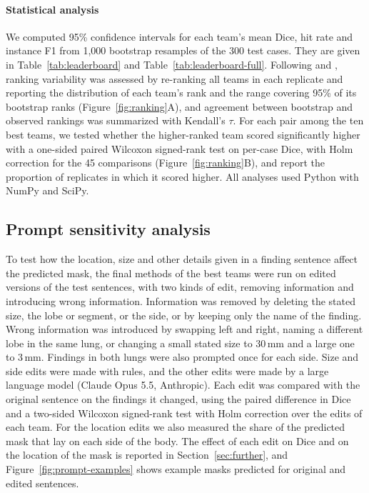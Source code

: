 \documentclass[final,5p,times,twocolumn,authoryear,numafflabel]{elsarticle}
\begin{document}
\paragraph{Statistical analysis}
We computed 95\% confidence intervals for each team's mean Dice, hit rate and
instance F1 from 1,000 bootstrap resamples of the 300 test cases. They are given in
Table~\ref{tab:leaderboard} and Table~\ref{tab:leaderboard-full}. Following
\citet{maier2018rankings} and \citet{wiesenfarth2021methods}, ranking
variability was assessed by re-ranking all teams in each replicate and
reporting the distribution of each team's rank and the range covering 95\% of
its bootstrap ranks (Figure~\ref{fig:ranking}A), and agreement between
bootstrap and observed rankings was summarized with Kendall's $\tau$. For each pair among the ten best teams, we tested whether the higher-ranked
team scored significantly higher with a one-sided paired Wilcoxon signed-rank
test on per-case Dice, with Holm correction for the 45 comparisons
(Figure~\ref{fig:ranking}B), and report the proportion of replicates in which
it scored higher. All
analyses used Python with NumPy and SciPy.

\subsection{Prompt sensitivity analysis}
\label{sec:prompt-exp}
To test how the location, size and other details given in a finding sentence
affect the predicted mask, the final methods of the
best teams were run on edited versions of the test
sentences, with two kinds of edit, removing information and introducing wrong
information. Information was removed by
deleting the stated size, the lobe or segment, or the side, or by keeping only
the name of the finding. Wrong information was introduced by swapping left and
right, naming a different lobe in the same lung, or changing a small stated size
to 30\,mm and a large one to 3\,mm. Findings in both lungs were also
prompted once for each side. Size and side edits were made with rules, and the
other edits were made by a large language model (Claude Opus 5.5, Anthropic).
Each edit was compared with the original sentence on the findings it changed,
using the paired difference in Dice and a two-sided Wilcoxon signed-rank test
with Holm correction over the edits of each team. For
the location edits we also measured the share of the predicted mask that lay on
each side of the body. The effect of each edit on Dice and on the location of the
mask is reported in Section~\ref{sec:further}, and Figure~\ref{fig:prompt-examples} shows example
masks predicted for original and edited sentences.
\end{document}
